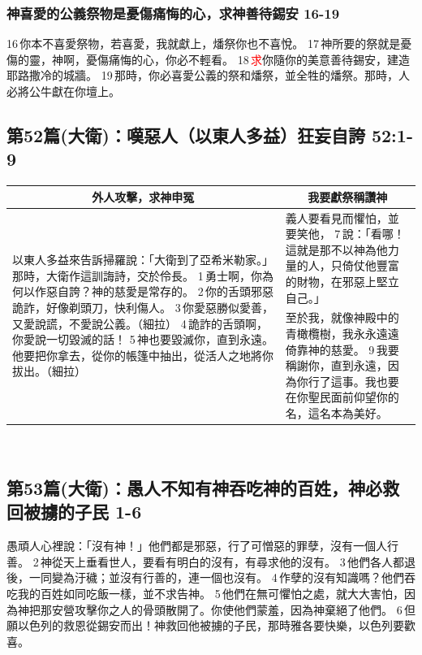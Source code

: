 \subsubsection{神喜愛的公義祭物是憂傷痛悔的心，求神善待錫安 16-19}
16 你本不喜愛祭物，若喜愛，我就獻上，燔祭你也不喜悅。
17 神所要的祭就是憂傷的靈，神啊，憂傷痛悔的心，你必不輕看。
18 \textcolor{red}{求}你隨你的美意善待錫安，建造耶路撒冷的城牆。
19 那時，你必喜愛公義的祭和燔祭，並全牲的燔祭。那時，人必將公牛獻在你壇上。

\subsection{第52篇(大衛)：嘆惡人（以東人多益）狂妄自誇 52:1-9}
\begin{table}[H]
\centering
\begin{tabular}{p{}|p{7.500cm}}\hline\hline
\multicolumn{1}{c|}{外人攻擊，求神申冤}&\multicolumn{1}{c}{我要獻祭稱讚神}\\\hline
\multirow{2}{9.2cm}{以東人多益來告訴掃羅說：「大衛到了亞希米勒家。」那時，大衛作這訓誨詩，交於伶長。
1 勇士啊，你為何以作惡自誇？神的慈愛是常存的。
2 你的舌頭邪惡詭詐，好像剃頭刀，快利傷人。
3 你愛惡勝似愛善，又愛說謊，不愛說公義。（細拉）
4 詭詐的舌頭啊，你愛說一切毀滅的話！
5 神也要毀滅你，直到永遠。他要把你拿去，從你的帳篷中抽出，從活人之地將你拔出。（細拉）}
&義人要看見而懼怕，並要笑他，
7 說：「看哪！這就是那不以神為他力量的人，只倚仗他豐富的財物，在邪惡上堅立自己。」\\\cline{2-2}
&至於我，就像神殿中的青橄欖樹，我永永遠遠倚靠神的慈愛。
9 我要稱謝你，直到永遠，因為你行了這事。我也要在你聖民面前仰望你的名，這名本為美好。\\\hline
\end{tabular}
\end{table} 


\subsection{第53篇(大衛)：愚人不知有神吞吃神的百姓，神必救回被擄的子民 1-6}
愚頑人心裡說：「沒有神！」他們都是邪惡，行了可憎惡的罪孽，沒有一個人行善。
2 神從天上垂看世人，要看有明白的沒有，有尋求他的沒有。
3 他們各人都退後，一同變為汙穢；並沒有行善的，連一個也沒有。
4 作孽的沒有知識嗎？他們吞吃我的百姓如同吃飯一樣，並不求告神。
5 他們在無可懼怕之處，就大大害怕，因為神把那安營攻擊你之人的骨頭散開了。你使他們蒙羞，因為神棄絕了他們。
6 但願以色列的救恩從錫安而出！神救回他被擄的子民，那時雅各要快樂，以色列要歡喜。

